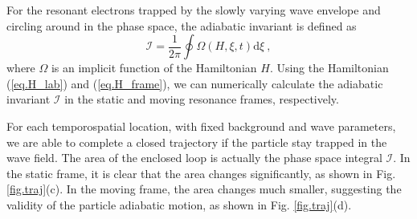 For the resonant electrons trapped by the slowly varying wave envelope and circling around in the phase space,  the adiabatic invariant is defined as
\begin{equation}\label{eq.def_I}
    \mathcal{I} = \frac{1}{2\pi} \oint \Omega(H,\xi,t) \mathrm{d} \xi~,
\end{equation}
where $\Omega$ is an implicit function of the Hamiltonian $H$.
Using the Hamiltonian (\ref{eq.H_lab}) and (\ref{eq.H_frame}), 
we can numerically calculate the adiabatic invariant $\mathcal{I}$  in the static and moving resonance frames, respectively.


For each temporospatial location, with fixed background and wave parameters, we are able to complete a closed trajectory if the particle stay trapped in the wave field.  
The area of the enclosed loop is actually the phase space integral $\mathcal{I}$.
In the static frame, it is clear that the area changes significantly,
as shown in Fig. \ref{fig.traj}(c). In the moving frame, the area changes much smaller, suggesting the validity of the particle adiabatic motion, as shown in Fig. \ref{fig.traj}(d). 

